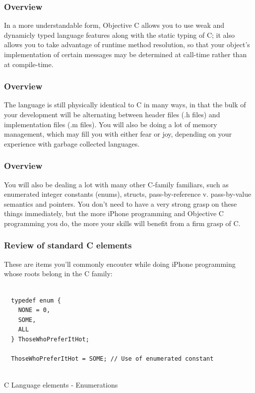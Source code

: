 \documentclass[10pt]{beamer}
\begin{document}
\begin{frame}[fragile]
  \frametitle{Overview}
  In a more understandable form, Objective C allows you to use weak and dynamicly typed language features along with the static typing of C; it also allows you to take advantage of runtime method resolution, so that your object's implementation of certain messages may be determined at call-time rather than at compile-time.

\end{frame}

\begin{frame}[fragile]
  \frametitle{Overview}
  The language is still physically identical to C in many ways, in that the bulk of your development will be alternating between header files (.h files) and implementation files (.m files). You will also be doing a lot of memory management, which may fill you with either fear or joy, depending on your experience with garbage collected languages.

\end{frame}

\begin{frame}[fragile]
  \frametitle{Overview}
  You will also be dealing a lot with many other C-family familiars, such as enumerated integer constants (enums), structs, pass-by-reference v. pass-by-value semantics and pointers.  You don't need to have a very strong grasp on these things immediately, but the more iPhone programming and Objective C programming you do, the more your skills will benefit from a firm grasp of C.

\end{frame}

    
\begin{frame}[fragile]
  \frametitle{Review of standard C elements}
  These are items you'll commonly encouter while doing iPhone programming whose roots belong in the C family: \begin{listing}[H]
    \begin{verbatim}
  
  typedef enum {
    NONE = 0,
    SOME,
    ALL
  } ThoseWhoPreferItHot;
  
  ThoseWhoPreferItHot = SOME; // Use of enumerated constant
              
  \end{verbatim}
    \caption{C Language elements - Enumerations}
    \label{listing:1}
  \end{listing}

\end{frame}
\end{document}
